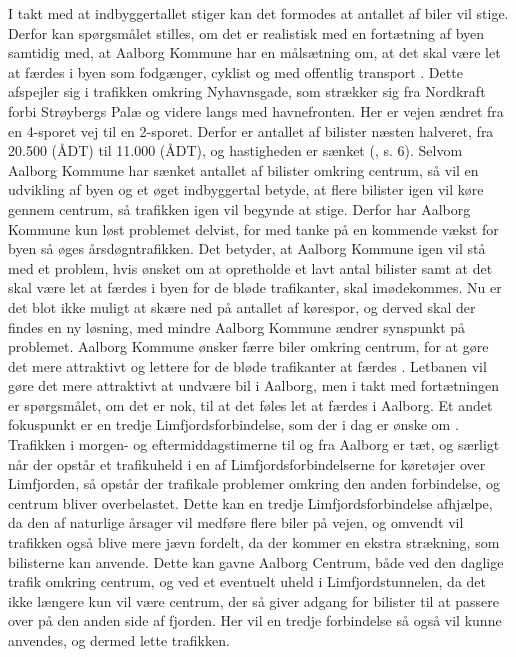 \newline \indent{     }  I takt med at indbyggertallet stiger kan det formodes at antallet af biler vil stige. Derfor kan spørgsmålet stilles, om det er realistisk med en fortætning af byen samtidig med, at Aalborg Kommune har en målsætning om, at det skal være let at færdes i byen som fodgænger, cyklist og med offentlig transport \citep{kommuneplan3}. Dette afspejler sig i trafikken omkring Nyhavnsgade, som strækker sig fra Nordkraft forbi Strøybergs Palæ og videre langs med havnefronten. Her er vejen ændret fra en 4-sporet vej til en 2-sporet. Derfor er antallet af bilister næsten halveret, fra 20.500 (ÅDT) til 11.000 (ÅDT), og hastigheden er sænket (\citep{lokalplan}, s. 6). Selvom Aalborg Kommune har sænket antallet af bilister omkring centrum, så vil en udvikling af byen og et øget indbyggertal betyde, at flere bilister igen vil køre gennem centrum, så trafikken igen vil begynde at stige. Derfor har Aalborg Kommune kun løst problemet delvist, for med tanke på en kommende vækst for byen så øges årsdøgntrafikken. Det betyder, at Aalborg Kommune igen vil stå med et problem, hvis ønsket om at opretholde et lavt antal bilister samt at det skal være let at færdes i byen for de bløde trafikanter, skal imødekommes. Nu er det blot ikke muligt at skære ned på antallet af kørespor, og derved skal der findes en ny løsning, med mindre Aalborg Kommune ændrer synspunkt på problemet.
\newline \indent{     }  Aalborg Kommune ønsker færre biler omkring centrum, for at gøre det mere attraktivt og lettere for de bløde trafikanter at færdes \citep{aalborgletbane}\citep{nordjyske}. Letbanen vil gøre det mere attraktivt at undvære bil i Aalborg, men i takt med fortætningen er spørgsmålet, om det er nok, til at det føles let at færdes i Aalborg. Et andet fokuspunkt er en tredje Limfjordsforbindelse, som der i dag er ønske om \citep{limfjordsforbindelsen}. Trafikken i morgen- og eftermiddagstimerne til og fra Aalborg er tæt, og særligt når der opstår et trafikuheld i en af Limfjordsforbindelserne for køretøjer over Limfjorden, så opstår der trafikale problemer omkring den anden forbindelse, og centrum bliver overbelastet. Dette kan en tredje Limfjordsforbindelse afhjælpe, da den af naturlige årsager vil medføre flere biler på vejen, og omvendt vil trafikken også blive mere jævn fordelt, da der kommer en ekstra strækning, som bilisterne kan anvende. Dette kan gavne Aalborg Centrum, både ved den daglige trafik omkring centrum, og ved et eventuelt uheld i Limfjordstunnelen, da det ikke længere kun vil være centrum, der så giver adgang for bilister til at passere over på den anden side af fjorden. Her vil en tredje forbindelse så også vil kunne anvendes, og dermed lette trafikken. 
